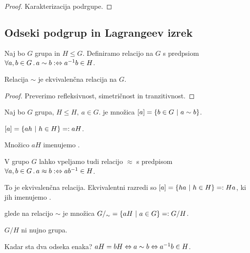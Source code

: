\begin{proof}
    Karakterizacija podrgupe.
\end{proof}

\subsection{Odseki podgrup in Lagrangeev izrek}
Naj bo $G$ grupa in $H \leq G$. Definiramo relacijo na $G$ s predpsiom $\forall a, b \in G \,.\, a \sim b :\Leftrightarrow a^{-1}b \in H$.

\begin{trditev}
    Relacija $\sim$ je ekvivalenčna relacija na $G$.
\end{trditev}

\begin{proof}
    Preverimo refleksivnost, simetričnost in tranzitivnost.
\end{proof}

\begin{definicija}
    Naj bo $G$ grupa, $H \leq H, \ a \in G$.  je množica $[a] = \left\{b \in G \ | \ a \sim b\right\}$.
\end{definicija}

\begin{opomba}
    $[a] = \left\{ah \ | \ h \in H\right\} =: aH$.
\end{opomba}

\begin{definicija}
    Množico $aH$ imenujemo .
\end{definicija}

\begin{opomba}
    V grupo $G$ lahko vpeljamo tudi relacijo $\approx$ s predpisom $\forall a, b \in G \,.\, a \approx b :\Leftrightarrow ab^{-1} \in H$.

    To je ekvivalenčna relacija. Ekvivalentni razredi so $[a] = \left\{ha \ | \ h \in H\right\} =: Ha$, ki jih imenujemo .
\end{opomba}

\begin{definicija}
     glede na relacijo $\sim$ je množica $G/_\sim = \left\{aH \ | \ a \in G\right\} =: G/H$.
\end{definicija}

\begin{opomba}
    $G/H$ ni nujno grupa.
\end{opomba}

\begin{opomba}
    Kadar sta dva odseka enaka? $aH = bH \Leftrightarrow a \sim b \Leftrightarrow a^{-1}b \in H$.
\end{opomba}

